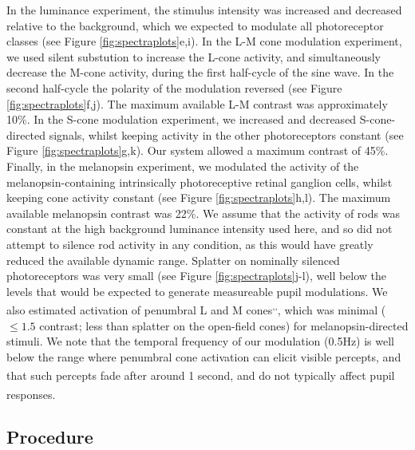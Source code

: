 \documentclass[
]{article}
\begin{document}
In the luminance experiment, the stimulus intensity was increased and decreased relative to the background, which we expected to modulate all photoreceptor classes (see Figure \ref{fig:spectraplots}e,i). In the L-M cone modulation experiment, we used silent substution to increase the L-cone activity, and simultaneously decrease the M-cone activity, during the first half-cycle of the sine wave. In the second half-cycle the polarity of the modulation reversed (see Figure \ref{fig:spectraplots}f,j). The maximum available L-M contrast was approximately 10\%. In the S-cone modulation experiment, we increased and decreased S-cone-directed signals, whilst keeping activity in the other photoreceptors constant (see Figure \ref{fig:spectraplots}g,k). Our system allowed a maximum contrast of 45\%. Finally, in the melanopsin experiment, we modulated the activity of the melanopsin-containing intrinsically photoreceptive retinal ganglion cells, whilst keeping cone activity constant (see Figure \ref{fig:spectraplots}h,l). The maximum available melanopsin contrast was 22\%. We assume that the activity of rods was constant at the high background luminance intensity used here, and so did not attempt to silence rod activity in any condition, as this would have greatly reduced the available dynamic range. Splatter on nominally silenced photoreceptors was very small (see Figure \ref{fig:spectraplots}j-l), well below the levels that would be expected to generate measureable pupil modulations. We also estimated activation of penumbral L and M cones\textsuperscript{,,}, which was minimal (\(\le 1.5%
\) contrast; less than splatter on the open-field cones) for melanopsin-directed stimuli. We note that the temporal frequency of our modulation (0.5Hz) is well below the range where penumbral cone activation can elicit visible percepts, and that such percepts fade after around 1 second\textsuperscript{}, and do not typically affect pupil responses\textsuperscript{}.

\subsection{Procedure}\label{procedure}
\end{document}
